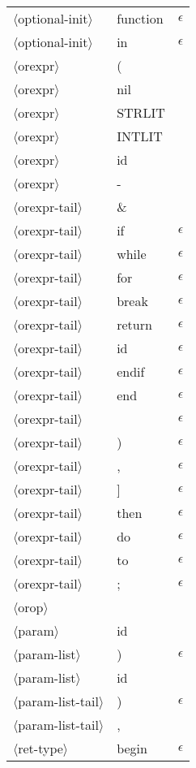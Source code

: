 \documentclass[11pt, fleqn]{article}
\newcommand{\atag}[1]{$\langle$#1$\rangle$}
\begin{document}
\begin{longtable}{l|l|l}
\atag{optional-init}				&	function		& $\epsilon$		\\
\atag{optional-init}				&	in		& $\epsilon$		\\
\atag{orexpr} 					&	(			&		\\
\atag{orexpr} 					&	nil			&		\\
\atag{orexpr} 					&	STRLIT			&		\\
\atag{orexpr} 					&	INTLIT			&		\\
\atag{orexpr} 					&	id			&		\\
\atag{orexpr} 					&	-			&		\\
\atag{orexpr-tail}				&	\& 		&		\\
\atag{orexpr-tail}				&	 if		&	$\epsilon$	\\
\atag{orexpr-tail}				&	 while		&	$\epsilon$	\\
\atag{orexpr-tail}				&	 for		&	$\epsilon$	\\
\atag{orexpr-tail}				&	 break		&	$\epsilon$	\\
\atag{orexpr-tail}				&	 return		&	$\epsilon$	\\
\atag{orexpr-tail}				&	 id		&	$\epsilon$	\\
\atag{orexpr-tail}				&	 endif		&	$\epsilon$	\\
\atag{orexpr-tail}				&	 end		&$\epsilon$		\\
\atag{orexpr-tail}				&	 \textbar		&	$\epsilon$	\\
\atag{orexpr-tail}				&	 )		&	$\epsilon$	\\
\atag{orexpr-tail}				&	 ,		&	$\epsilon$	\\
\atag{orexpr-tail}				&	 ]		&	$\epsilon$	\\
\atag{orexpr-tail}				&	 then		&	$\epsilon$	\\
\atag{orexpr-tail}				&	 do		&	$\epsilon$	\\
\atag{orexpr-tail}				&	 to		&	$\epsilon$	\\
\atag{orexpr-tail}				&	 ;		&	$\epsilon$	\\
\atag{orop} 						&	\textbar		&	\\
\atag{param}						&	id		&	\\
\atag{param-list}				&	)		&	$\epsilon$	\\
\atag{param-list}				&	id		&		\\
\atag{param-list-tail}			&	)		&	$\epsilon$	\\
\atag{param-list-tail}			&	,		&		\\
\atag{ret-type}					&	begin	&	$\epsilon$	\\

\end{longtable}
\end{document}

